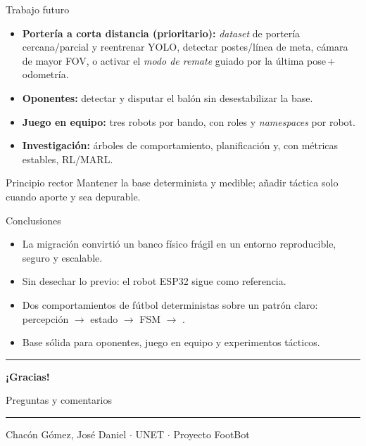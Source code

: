 \documentclass[aspectratio=169,11pt]{beamer}
\newcommand{\code}[1]{\texttt{\detokenize{#1}}}
\begin{document}
\begin{frame}{Trabajo futuro}
  \begin{itemize}
    \item \textbf{Portería a corta distancia (prioritario):} \emph{dataset} de portería cercana/parcial y reentrenar YOLO, detectar postes/línea de meta, cámara de mayor FOV, o activar el \emph{modo de remate} \code{COMMIT_TO_GOAL} guiado por la última pose\,+\,odometría.
    \item \textbf{Oponentes:} detectar y disputar el balón sin desestabilizar la base.
    \item \textbf{Juego en equipo:} tres robots por bando, con roles y \emph{namespaces} por robot.
    \item \textbf{Investigación:} árboles de comportamiento, planificación y, con métricas estables, RL/MARL.
  \end{itemize}
  \vspace{0.25cm}
  \begin{block}{Principio rector}
    Mantener la base \alert{determinista} y medible; añadir táctica solo cuando aporte y sea depurable.
  \end{block}
\end{frame}

\begin{frame}{Conclusiones}
  \begin{itemize}
    \item La migración convirtió un banco físico frágil en un entorno \alert{reproducible, seguro y escalable}.
    \item Sin desechar lo previo: el robot ESP32 sigue como referencia.
    \item Dos comportamientos de fútbol deterministas sobre un patrón claro:\\ percepción $\rightarrow$ estado $\rightarrow$ FSM $\rightarrow$ \code{/cmd_vel}.
    \item Base sólida para oponentes, juego en equipo y experimentos tácticos.
  \end{itemize}
\end{frame}

\begin{frame}[plain]
  \centering
  \vspace{1.1cm}
  {\color{unetblue}\rule{0.7\linewidth}{1pt}}\par\vspace{0.5cm}
  {\Huge\bfseries\color{unetblue} ¡Gracias!\par}
  \vspace{0.3cm}
  {\large Preguntas y comentarios\par}
  \vspace{0.4cm}
  {\color{unetblue}\rule{0.7\linewidth}{1pt}}\par
  \vspace{0.6cm}
  {\small Chacón Gómez, José Daniel \;$\cdot$\; UNET \;$\cdot$\; Proyecto FootBot\par}
\end{frame}
\end{document}
